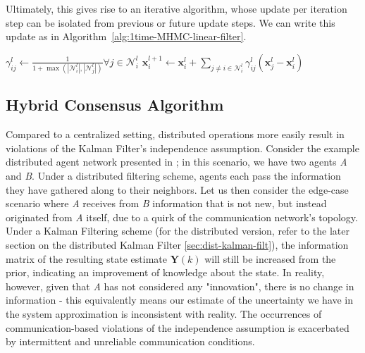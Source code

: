 Ultimately, this gives rise to an iterative algorithm, whose update per iteration step can be isolated from previous or future update steps. We can write this update as in Algorithm~\ref{alg:1time-MHMC-linear-filter}.

\begin{algorithm}
    \caption{One-time Update for Distributed MHMC-weighted Linear Filter}\label{alg:1time-MHMC-linear-filter}
    $\gamma_{ij}^l\gets\frac{1}{1+\max\left(\left|\mathcal{N}_i^l\right|,\left|\mathcal{N}_j^l\right|\right)} \forall j\in\mathcal{N}_i^l$\;
    $\bm{x}^{l+1}_i \gets \bm{x}^l_i + \sum_{j \neq i\in\mathcal{N}_i^l} \gamma^l_{ij} (\bm{x}^l_j - \bm{x}^l_i)$\;
\end{algorithm}



\subsection{Hybrid Consensus Algorithm} \label{sec:hybrid-consensus}

Compared to a centralized setting, distributed operations more easily result in violations of the Kalman Filter's independence assumption. Consider the example distributed agent network presented in \cite{chen2002estimation}; in this scenario, we have two agents \textit{A} and \textit{B}. Under a distributed filtering scheme, agents each pass the information they have gathered along to their neighbors. Let us then consider the edge-case scenario where \textit{A} receives from \textit{B} information that is not new, but instead originated from \textit{A} itself, due to a quirk of the communication network's topology. Under a Kalman Filtering scheme (for the distributed version, refer to the later section on the distributed Kalman Filter \ref{sec:dist-kalman-filt}), the information matrix of the resulting state estimate $\mathbf{Y}(k)$ will still be increased from the prior, indicating an improvement of knowledge about the state. In reality, however, given that \textit{A} has not considered any "innovation", there is no change in information - this equivalently means our estimate of the uncertainty we have in the system approximation is inconsistent with reality. The occurrences of communication-based violations of the independence assumption is exacerbated by intermittent and unreliable communication conditions. 

